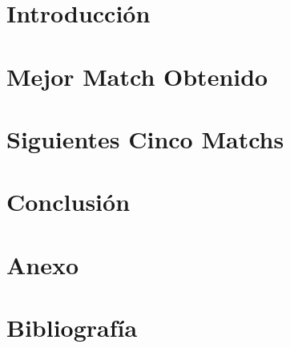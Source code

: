 \documentclass[letter, 10pt]{article}
\begin{document}
\tableofcontents
\newpage
\section{Introducción}
\label{sec:introduccion}

\newpage

\section{Mejor Match Obtenido}
\label{sec:mejor}

\newpage

\section{Siguientes Cinco Matchs}
\label{sec:cinco}

\newpage

\section{Conclusión}
\label{sec:conclusion}

\newpage

\section{Anexo}
\label{sec:anexo}


\section{Bibliografía}

\end{document}

